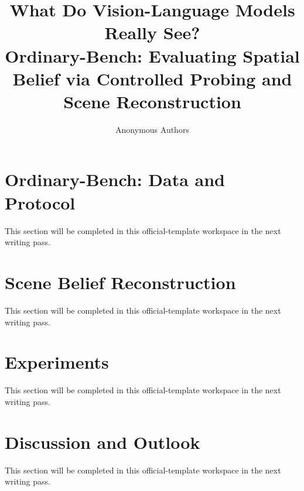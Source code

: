 \documentclass{article}
\title{What Do Vision-Language Models Really See?\\
Ordinary-Bench: Evaluating Spatial Belief via Controlled Probing and Scene Reconstruction}
\author{Anonymous Authors}
\begin{document}
\maketitle

\begin{abstract}

\end{abstract}




\section{Ordinary-Bench: Data and Protocol}
This section will be completed in this official-template workspace in the next writing pass.

\section{Scene Belief Reconstruction}
This section will be completed in this official-template workspace in the next writing pass.

\section{Experiments}
This section will be completed in this official-template workspace in the next writing pass.

\section{Discussion and Outlook}
This section will be completed in this official-template workspace in the next writing pass.



\end{document}
